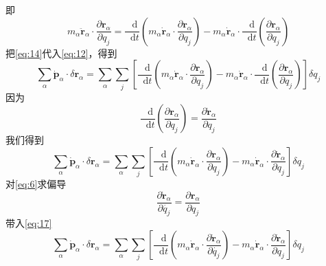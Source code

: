 \documentclass{article}
\newcommand*{\dif}{\mathop{}\!\mathrm{d}}
\begin{document}
即
\begin{equation}
  \label{eq:14}
  m_{\alpha} \ddot{\mathbf{r}}_{\alpha}  \cdot  \frac{\partial \mathbf{r}_{\alpha}}{\partial q_{j}} = \frac{\dif}{\dif t} \left( m_{\alpha} \dot{\mathbf{r}}_{\alpha} \cdot \frac{\partial \mathbf{r}_{\alpha}}{\partial q_{j}} \right) -  m_{\alpha} \dot{\mathbf{r}}_{\alpha} \cdot \frac{\dif}{\dif t} \left(  \frac{\partial \mathbf{r}_{\alpha}}{\partial q_{j}}  \right)
\end{equation}
把\ref{eq:14}代入\ref{eq:12}，得到
\begin{equation}
  \label{eq:15}
  \sum\limits_{\alpha} \dot{\mathbf{p}}_{\alpha} \cdot \delta \mathbf{r}_{\alpha} = \sum\limits_{\alpha} \sum\limits_{j} \left[ \frac{\dif}{\dif t} \left( m_{\alpha} \dot{\mathbf{r}}_{\alpha} \cdot \frac{\partial \mathbf{r}_{\alpha}}{\partial q_{j}} \right) -  m_{\alpha} \dot{\mathbf{r}}_{\alpha} \cdot \frac{\dif}{\dif t} \left(  \frac{\partial \mathbf{r}_{\alpha}}{\partial q_{j}}  \right) \right]\delta q_{j}
\end{equation}
因为
\begin{equation}
  \frac{\dif}{\dif t} \left(  \frac{\partial \mathbf{r}_{\alpha}}{\partial q_{j}} \right) = \frac{\partial \dot{\mathbf{r}}_{\alpha}}{\partial q_{j}}
\end{equation}
我们得到
\begin{equation}
  \label{eq:17}
  \sum\limits_{\alpha} \dot{\mathbf{p}}_{\alpha} \cdot \delta \mathbf{r}_{\alpha} = \sum\limits_{\alpha} \sum\limits_{j} \left[ \frac{\dif}{\dif t} \left( m_{\alpha} \dot{\mathbf{r}}_{\alpha} \cdot \frac{\partial \mathbf{r}_{\alpha}}{\partial q_{j}} \right) -  m_{\alpha} \dot{\mathbf{r}}_{\alpha} \cdot  \frac{\partial \dot{\mathbf{r}}_{\alpha}}{\partial q_{j}} \right]\delta q_{j}
\end{equation}
对\ref{eq:6}求偏导
\begin{equation}
  \label{eq:18}
  \frac{\partial \dot{\mathbf{r}}_{\alpha}}{\partial \dot{q_{j}}} = \frac{\partial \mathbf{r}_{\alpha}}{\partial q_{j}}
\end{equation}
带入\ref{eq:17}
\begin{equation}
  \label{eq:19}
  \sum\limits_{\alpha} \dot{\mathbf{p}}_{\alpha} \cdot \delta \mathbf{r}_{\alpha} = \sum\limits_{\alpha} \sum\limits_{j} \left[ \frac{\dif}{\dif t} \left( m_{\alpha} \dot{\mathbf{r}}_{\alpha} \cdot \frac{\partial \dot{\mathbf{r}}_{\alpha}}{\partial \dot{q_{j}}} \right) -  m_{\alpha} \dot{\mathbf{r}}_{\alpha} \cdot  \frac{\partial \dot{\mathbf{r}}_{\alpha}}{\partial q_{j}} \right]\delta q_{j}
\end{equation}
\end{document}
